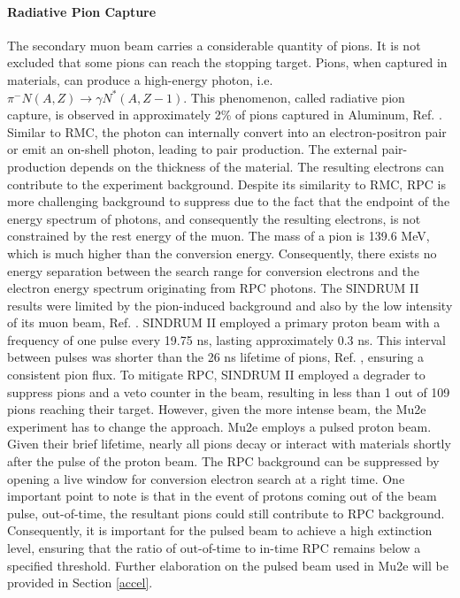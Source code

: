 \paragraph{Radiative Pion Capture}
The secondary muon beam carries a considerable quantity of pions.  It is not excluded 
that some pions can reach the stopping target. Pions, when captured in materials, can 
produce a high-energy photon, i.e. $\pi^- N(A,Z) \rightarrow \gamma N ^* (A,Z-1)$. 
This phenomenon, called radiative pion capture, is observed in approximately 2\% of 
pions captured in Aluminum, Ref. \cite{PhysRevC.5.1867}. Similar to RMC, the photon 
can internally convert into an electron-positron pair or emit an on-shell photon, 
leading to pair production. The external pair-production depends on the thickness 
of the material. The resulting electrons can contribute to the experiment background. 
Despite its similarity to RMC, RPC is more challenging background to suppress due to 
the fact that the endpoint of the energy spectrum of photons, and consequently the 
resulting electrons, is not constrained by the rest energy of the muon. The mass of 
a pion is 139.6 MeV, which is much higher than the conversion energy. Consequently, 
there exists no energy separation between the search range for conversion electrons 
and the electron energy spectrum originating from RPC photons. The SINDRUM II results 
were limited by the pion-induced background and also by the low intensity of its muon 
beam, Ref. \cite{SINDRUMII:2006dvw}. SINDRUM II employed a primary proton beam with a 
frequency of one pulse every 19.75 ns, lasting approximately 0.3 ns. This interval 
between pulses was shorter than the 26 ns lifetime of pions, Ref. \cite{zyla}, 
ensuring a consistent pion flux. To mitigate RPC, SINDRUM II employed a degrader to suppress 
pions and a veto counter in the beam, resulting in less than 1 out of 109 pions reaching their 
target. However, given the more intense beam, the Mu2e experiment has to change the approach. 
Mu2e employs a pulsed proton beam. Given their brief lifetime, nearly all pions decay or 
interact with materials shortly after the pulse of the proton beam. The RPC background 
can be suppressed by opening a live window for conversion electron search at a right time. 
One important point to note is that in the event of protons coming out of the beam pulse, 
out-of-time, the resultant pions could still contribute to RPC background. Consequently, 
it is important for the pulsed beam to achieve a high extinction level, ensuring that the 
ratio of out-of-time to in-time RPC remains below a specified threshold. Further elaboration 
on the pulsed beam used in Mu2e will be provided in Section \ref{accel}.
